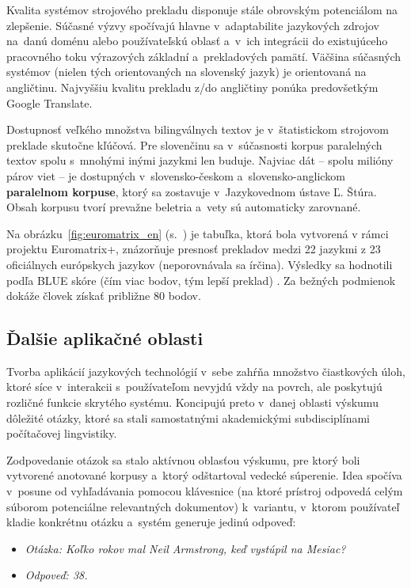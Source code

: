 \begin{multicols}{2}

Kvalita systémov strojového prekladu disponuje stále obrovským
potenciálom na zlepšenie. Súčasné výzvy spočívajú hlavne
v~adaptabilite jazykových zdrojov na~danú doménu alebo
používateľskú oblasť a~v~ich integrácii do existujúceho
pracovného toku výrazových základní a~prekladových pamätí.
Väčšina súčasných systémov (nielen tých orientovaných na
slovenský jazyk) je orientovaná na angličtinu. Najvyššiu kvalitu
prekladu z/do angličtiny ponúka predovšetkým Google Translate. 

Dostupnosť veľkého množstva bilingválnych textov je v~štatistickom
strojovom preklade skutočne kľúčová. Pre slovenčinu sa
v~súčasnosti korpus paralelných textov spolu s~mnohými inými
jazykmi len buduje. Najviac dát -- spolu milióny párov viet -- je
dostupných v~slovensko-českom a~slovensko-anglickom \textbf{paralelnom
korpuse}, ktorý sa zostavuje v~Jazykovednom ústave Ľ. Štúra. Obsah
korpusu tvorí prevažne beletria a~vety sú automaticky zarovnané.

Na obrázku~\ref{fig:euromatrix_en} (s.~\pageref{fig:euromatrix_en}) je tabuľka, ktorá bola vytvorená v rámci projektu Euromatrix+, znázorňuje presnosť prekladov medzi 22 jazykmi z 23 oficiálnych európskych jazykov (neporovnávala sa írčina). Výsledky sa hodnotili podľa BLUE skóre (čím viac bodov, tým lepší preklad) \cite{bleu1}. Za bežných podmienok dokáže človek získať približne 80 bodov.

\subsection{Ďalšie aplikačné oblasti}
Tvorba aplikácií jazykových technológií v~sebe zahŕňa množstvo čiastkových úloh, ktoré síce v~interakcii s~používateľom nevyjdú vždy na povrch, ale poskytujú rozličné funkcie skrytého systému. Koncipujú preto v~danej oblasti výskumu dôležité otázky, ktoré sa stali samostatnými akademickými subdisciplínami počítačovej lingvistiky.

Zodpovedanie otázok sa stalo aktívnou oblasťou výskumu,
pre ktorý boli vytvorené anotované korpusy a~ktorý odštartoval
vedecké súperenie. Idea spočíva v~posune od vyhľadávania pomocou
klávesnice (na ktoré prístroj odpovedá celým súborom potenciálne
relevantných dokumentov) k~variantu, v~ktorom používateľ kladie
konkrétnu otázku a~systém generuje jedinú odpoveď:

\begin{itemize}
	\item[] \textit{Otázka: Koľko rokov mal
Neil Armstrong, keď vystúpil na Mesiac?}
	\item[] \textit{Odpoveď: 38.}
\end{itemize}


\end{multicols}
